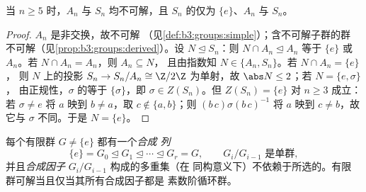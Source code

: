 \begin{corollary}\label{cor:b3:groups:snnotsolvable}
当 $n \geq 5$ 时，$A_n$ 与 $S_n$ 均不可解，且
$S_n$ 的仅为 $\{e\}$、$A_n$ 与 $S_n$。
\end{corollary}

\begin{proof}
$A_n$ 是非交换，故不可解
（见\cref{def:b3:groups:simple}）；含不可解子群的群
不可解（见\cref{prop:b3:groups:derived}）。设 $N
\trianglelefteq S_n$：则 $N \cap A_n \trianglelefteq A_n$ 等于
$\{e\}$ 或 $A_n$。若 $N \cap A_n = A_n$，则 $A_n \subseteq N$，
且由指数知 $N \in \{A_n, S_n\}$。若 $N \cap A_n = \{e\}$，
则 $N$ 上的投影 $S_n \to S_n/A_n \cong
\Z/2\Z$ 为单射，故 $\abs N \leq 2$；若 $N = \{e, \sigma\}$，
由正规性，$\sigma$ 的等于
$\{\sigma\}$，即 $\sigma \in Z(S_n)$。但 $Z(S_n) = \{e\}$ 对
$n \geq 3$ 成立：若 $\sigma \ne e$ 将 $a$ 映到 $b \neq a$，取 $c
\notin \{a, b\}$；则 $(b\,c)\sigma(b\,c)^{-1}$ 将 $a$ 映到 $c
\ne b$，故它与 $\sigma$ 不同。于是 $N = \{e\}$。
\end{proof}

\begin{theorem}\label{thm:b3:groups:jordanholder}
每个有限群 $G \neq \{e\}$ 都有一个\emph{合成
列}
\[
\{e\} = G_0 \trianglelefteq G_1 \trianglelefteq \cdots
\trianglelefteq G_r = G,
\qquad G_{i}/G_{i-1} \text{ 是单群},
\]
并且\emph{合成因子} $G_i/G_{i-1}$ 构成的多重集（在
同构意义下）不依赖于所选的。有限
群可解当且仅当其所有合成因子都是
素数阶循环群。
\end{theorem}

